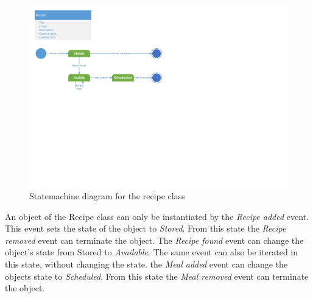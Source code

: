 \begin{figure}[H]
	\centering
	\includegraphics[clip=true, trim=0.5cm 11cm 14cm 0.5cm]{Development/ProblemDomain/RecipeClass.pdf}
	\caption{Statemachine diagram for the recipe class} \label{RecipeClass}
\end{figure}

An object of the Recipe class can only be instantiated by the \textit{Recipe added} event. This event sets the state of the object to \textit{Stored}. From this state the \textit{Recipe removed} event can terminate the object. The \textit{Recipe found} event can change the object's state from Stored to \textit{Available}. The same event can also be iterated in this state, without changing the state. the \textit{Meal added} event can change the objects state to \textit{Scheduled}. From this state the \textit{Meal removed} event can terminate the object.